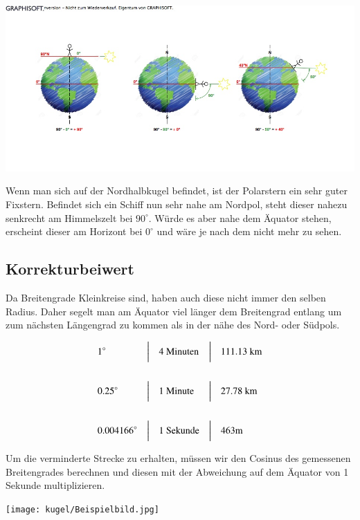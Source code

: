 \begin{refsection}
\begin{center}
        \includegraphics[width=1\textwidth]{kugel/1Breitengrad.jpg}
\end{center}

Wenn man sich auf der Nordhalbkugel befindet, ist der Polarstern ein sehr guter Fixstern. Befindet sich ein Schiff nun sehr nahe am Nordpol, steht dieser nahezu senkrecht am Himmelszelt bei $90^{\circ}$. Würde es aber nahe dem Äquator stehen, erscheint dieser am Horizont bei $0^{\circ}$ und wäre je nach dem nicht mehr zu sehen.


\subsection{Korrekturbeiwert}
Da Breitengrade Kleinkreise sind, haben auch diese nicht immer den selben Radius. Daher segelt man am Äquator viel länger dem Breitengrad entlang um zum nächsten Längengrad zu kommen als in der nähe des Nord- oder Südpols.

\[
\begin{aligned}
&\text{1}^{\circ}
&
&\text{\bigg \vert}
&
&\text{4 Minuten}
&
&\text{\bigg \vert}
&
&\text{111.13 km}
\\
\\
&\text{0.25}^{\circ}
&
&\text{\bigg \vert}
&
&\text{1 Minute}
&
&\text{\bigg \vert}
&
&\text{27.78 km}
\\
\\
&\text{0.004166}^{\circ}
&
&\text{\bigg \vert}
&
&\text{1 Sekunde}
&
&\text{\bigg \vert}
&
&\text{463m}
\end{aligned}
\]

Um die verminderte Strecke zu erhalten, müssen wir den Cosinus des gemessenen Breitengrades berechnen und diesen mit der Abweichung auf dem Äquator von 1 Sekunde multiplizieren.

\begin{center}
        \texttt{[image: kugel/Beispielbild.jpg]}
\end{center}


\end{refsection}
